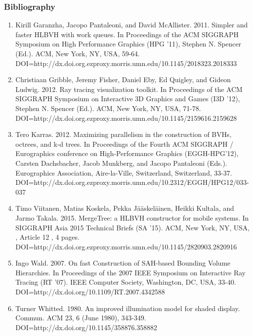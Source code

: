 \documentclass{beamer}
\begin{document}
\begin{frame}
  \frametitle{Bibliography}
\begin{tiny}
\begin{enumerate}
	\item Kirill Garanzha, Jacopo Pantaleoni, and David McAllister. 2011. Simpler and faster HLBVH with work queues. In Proceedings of the ACM SIGGRAPH Symposium on High Performance Graphics (HPG '11), Stephen N. Spencer (Ed.). ACM, New York, NY, USA, 59-64. DOI=http://dx.doi.org.ezproxy.morris.umn.edu/10.1145/2018323.2018333
	\item Christiaan Gribble, Jeremy Fisher, Daniel Eby, Ed Quigley, and Gideon Ludwig. 2012. Ray tracing visualization toolkit. In Proceedings of the ACM SIGGRAPH Symposium on Interactive 3D Graphics and Games (I3D '12), Stephen N. Spencer (Ed.). ACM, New York, NY, USA, 71-78. DOI=http://dx.doi.org.ezproxy.morris.umn.edu/10.1145/2159616.2159628
	\item Tero Karras. 2012. Maximizing parallelism in the construction of BVHs, octrees, and k-d trees. In Proceedings of the Fourth ACM SIGGRAPH / Eurographics conference on High-Performance Graphics (EGGH-HPG'12), Carsten Dachsbacher, Jacob Munkberg, and Jacopo Pantaleoni (Eds.). Eurographics Association, Aire-la-Ville, Switzerland, Switzerland, 33-37. DOI=http://dx.doi.org.ezproxy.morris.umn.edu/10.2312/EGGH/HPG12/033-037
	\item Timo Viitanen, Matias Koskela, Pekka Jääskeläinen, Heikki Kultala, and Jarmo Takala. 2015. MergeTree: a HLBVH constructor for mobile systems. In SIGGRAPH Asia 2015 Technical Briefs (SA '15). ACM, New York, NY, USA, , Article 12 , 4 pages. DOI=http://dx.doi.org.ezproxy.morris.umn.edu/10.1145/2820903.2820916
	\item Ingo Wald. 2007. On fast Construction of SAH-based Bounding Volume Hierarchies. In Proceedings of the 2007 IEEE Symposium on Interactive Ray Tracing (RT '07). IEEE Computer Society, Washington, DC, USA, 33-40. DOI=http://dx.doi.org/10.1109/RT.2007.4342588
	\item Turner Whitted. 1980. An improved illumination model for shaded display. Commun. ACM 23, 6 (June 1980), 343-349. DOI=http://dx.doi.org/10.1145/358876.358882
\end{enumerate}
\end{tiny}
\end{frame}
\end{document}

